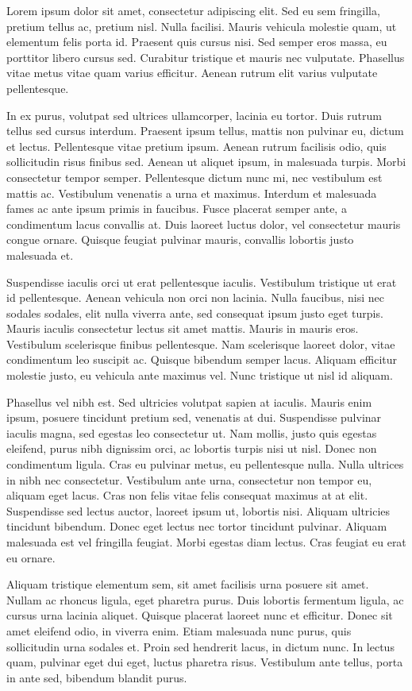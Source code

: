 
Lorem ipsum dolor sit amet, consectetur adipiscing elit. Sed eu sem fringilla, pretium tellus ac, pretium nisl. Nulla facilisi. Mauris vehicula molestie quam, ut elementum felis porta id. Praesent quis cursus nisi. Sed semper eros massa, eu porttitor libero cursus sed. Curabitur tristique et mauris nec vulputate. Phasellus vitae metus vitae quam varius efficitur. Aenean rutrum elit varius vulputate pellentesque.

In ex purus, volutpat sed ultrices ullamcorper, lacinia eu tortor. Duis rutrum tellus sed cursus interdum. Praesent ipsum tellus, mattis non pulvinar eu, dictum et lectus. Pellentesque vitae pretium ipsum. Aenean rutrum facilisis odio, quis sollicitudin risus finibus sed. Aenean ut aliquet ipsum, in malesuada turpis. Morbi consectetur tempor semper. Pellentesque dictum nunc mi, nec vestibulum est mattis ac. Vestibulum venenatis a urna et maximus. Interdum et malesuada fames ac ante ipsum primis in faucibus. Fusce placerat semper ante, a condimentum lacus convallis at. Duis laoreet luctus dolor, vel consectetur mauris congue ornare. Quisque feugiat pulvinar mauris, convallis lobortis justo malesuada et.

Suspendisse iaculis orci ut erat pellentesque iaculis. Vestibulum tristique ut erat id pellentesque. Aenean vehicula non orci non lacinia. Nulla faucibus, nisi nec sodales sodales, elit nulla viverra ante, sed consequat ipsum justo eget turpis. Mauris iaculis consectetur lectus sit amet mattis. Mauris in mauris eros. Vestibulum scelerisque finibus pellentesque. Nam scelerisque laoreet dolor, vitae condimentum leo suscipit ac. Quisque bibendum semper lacus. Aliquam efficitur molestie justo, eu vehicula ante maximus vel. Nunc tristique ut nisl id aliquam.

Phasellus vel nibh est. Sed ultricies volutpat sapien at iaculis. Mauris enim ipsum, posuere tincidunt pretium sed, venenatis at dui. Suspendisse pulvinar iaculis magna, sed egestas leo consectetur ut. Nam mollis, justo quis egestas eleifend, purus nibh dignissim orci, ac lobortis turpis nisi ut nisl. Donec non condimentum ligula. Cras eu pulvinar metus, eu pellentesque nulla. Nulla ultrices in nibh nec consectetur. Vestibulum ante urna, consectetur non tempor eu, aliquam eget lacus. Cras non felis vitae felis consequat maximus at at elit. Suspendisse sed lectus auctor, laoreet ipsum ut, lobortis nisi. Aliquam ultricies tincidunt bibendum. Donec eget lectus nec tortor tincidunt pulvinar. Aliquam malesuada est vel fringilla feugiat. Morbi egestas diam lectus. Cras feugiat eu erat eu ornare.

Aliquam tristique elementum sem, sit amet facilisis urna posuere sit amet. Nullam ac rhoncus ligula, eget pharetra purus. Duis lobortis fermentum ligula, ac cursus urna lacinia aliquet. Quisque placerat laoreet nunc et efficitur. Donec sit amet eleifend odio, in viverra enim. Etiam malesuada nunc purus, quis sollicitudin urna sodales et. Proin sed hendrerit lacus, in dictum nunc. In lectus quam, pulvinar eget dui eget, luctus pharetra risus. Vestibulum ante tellus, porta in ante sed, bibendum blandit purus.
